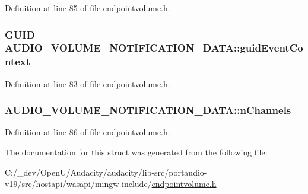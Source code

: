 Definition at line 85 of file endpointvolume.\+h.

\subsubsection[{\texorpdfstring{guid\+Event\+Context}{guidEventContext}}]{\setlength{\rightskip}{0pt plus 5cm}G\+U\+ID A\+U\+D\+I\+O\+\_\+\+V\+O\+L\+U\+M\+E\+\_\+\+N\+O\+T\+I\+F\+I\+C\+A\+T\+I\+O\+N\+\_\+\+D\+A\+T\+A\+::guid\+Event\+Context}\hypertarget{struct_a_u_d_i_o___v_o_l_u_m_e___n_o_t_i_f_i_c_a_t_i_o_n___d_a_t_a_a6add2da9bc4c17887411d8b549b97eb4}{}\label{struct_a_u_d_i_o___v_o_l_u_m_e___n_o_t_i_f_i_c_a_t_i_o_n___d_a_t_a_a6add2da9bc4c17887411d8b549b97eb4}


Definition at line 83 of file endpointvolume.\+h.

\subsubsection[{\texorpdfstring{n\+Channels}{nChannels}}]{ A\+U\+D\+I\+O\+\_\+\+V\+O\+L\+U\+M\+E\+\_\+\+N\+O\+T\+I\+F\+I\+C\+A\+T\+I\+O\+N\+\_\+\+D\+A\+T\+A\+::n\+Channels}\hypertarget{struct_a_u_d_i_o___v_o_l_u_m_e___n_o_t_i_f_i_c_a_t_i_o_n___d_a_t_a_a98284a9869793fb797df699d3f6d66ff}{}\label{struct_a_u_d_i_o___v_o_l_u_m_e___n_o_t_i_f_i_c_a_t_i_o_n___d_a_t_a_a98284a9869793fb797df699d3f6d66ff}


Definition at line 86 of file endpointvolume.\+h.



The documentation for this struct was generated from the following file\+:\begin{DoxyCompactItemize}
\item 
C\+:/\+\_\+dev/\+Open\+U/\+Audacity/audacity/lib-\/src/portaudio-\/v19/src/hostapi/wasapi/mingw-\/include/\hyperlink{endpointvolume_8h}{endpointvolume.\+h}\end{DoxyCompactItemize}
